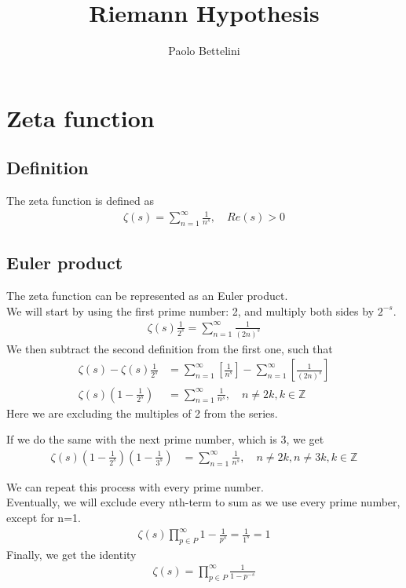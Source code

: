 \documentclass{article}
\title{Riemann Hypothesis}
\author{Paolo Bettelini}
\date{}
\begin{document}
\maketitle
\tableofcontents
\pagebreak

\section{Zeta function}

\subsection{Definition}
The zeta function is defined as
\begin{align*}
    \zeta(s)=\sum_{n=1}^{\infty}\frac{1}{n^s},\quad Re(s)>0
\end{align*}

\subsection{Euler product}
The zeta function can be represented as an Euler product.
\\
We will start by using the first prime number: 2, and multiply both sides by $2^{-s}$.
\begin{align*}
    \zeta(s)\frac{1}{2^s}=\sum_{n=1}^{\infty}\frac{1}{(2n)^s}
\end{align*}
We then subtract the second definition from the first one, such that
\begin{align*}
    \zeta(s)-\zeta(s)\frac{1}{2^s}&=
    \sum_{n=1}^{\infty}\left[\frac{1}{n^s}\right]-
    \sum_{n=1}^{\infty}\left[\frac{1}{(2n)^s}\right]
    \\
    \zeta(s)\left(1-\frac{1}{2^s}\right)&=
    \sum_{n=1}^{\infty}\frac{1}{n^s},
    \quad n\neq 2k,k\in \mathds{Z}
\end{align*}
Here we are excluding the multiples of 2 from the series.

If we do the same with the next prime number, which is 3, we get
\begin{align*}
    \zeta(s)\left(1-\frac{1}{2^s}\right)\left(1-\frac{1}{3^s}\right)&=
    \sum_{n=1}^{\infty}\frac{1}{n^s},
    \quad n\neq 2k,n\neq 3k, k\in \mathds{Z}
\end{align*}

We can repeat this process with every prime number.
\\
Eventually, we will exclude every nth-term to sum as we use every prime number, except for n=1.
\begin{align*}
    \zeta(s)\prod_{p\in P}^{\infty}1-\frac{1}{p^s}=\frac{1}{1^s}=1
\end{align*}
Finally, we get the identity
\begin{align*}
    \zeta(s)=
    \prod_{p\in P}^{\infty}\frac{1}{1-p^{-s}}
\end{align*}
\end{document}
